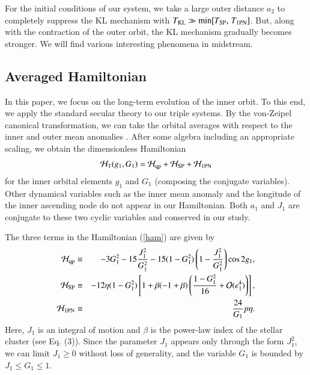 \documentclass[useAMS,usenatbib,twocolumn]{mn2e}
\newcommand{\beqa}{\begin{eqnarray}}
\newcommand{\eeqa}{\end{eqnarray}}
\begin{document}
For the initial conditions of our system, we take a large outer distance $a_2$ to
completely suppress the KL mechanism with 
$T_{\rm KL}\gg{\rm min}[T_{\rm SP},\,T_{\rm 1PN}]$. But, along with the contraction
of
the outer orbit, the KL mechanism gradually becomes stronger. We will find
various interesting phenomena in midstream.




\subsection{Averaged Hamiltonian}



In this paper, we focus on the long-term evolution of the inner
orbit. To this end, we apply the standard secular theory to our
triple systems. By the von-Zeipel canonical transformation, we
can take the orbital averages with respect to the inner and
outer mean anomalies \citep{harrington1968,ford2000,blaes2002}.
After some algebra including an appropriate scaling, we obtain
the dimensionless Hamiltonian
\beqa 
\mathcal{H}_{\rm T}(g_{1}, G_{1})=\mathcal{H}_{\rm
qp}+\mathcal{H}_{\rm SP}+\mathcal{H}_{\rm 1PN}
\label{ham}
\eeqa
for the inner orbital elements $g_1$ and $G_1$ (composing the
conjugate variables).
Other dynamical variables such as the inner mean anomaly and the
longitude of the inner ascending node do not appear in our Hamiltonian.
Both $a_1$ and $J_1$ are conjugate to these two  cyclic variables
 and conserved in our study.
 


The three terms in the Hamiltonian (\ref{ham}) are given by
\beqa
\mathcal{H}_{\rm qp}&\equiv&
-3G_{1}^{2}-15\frac{J_{1}^{2}}{G_{1}^{2}}-15(1-G_{1}^{2})\left(1-\frac{J_{1}^{2}}{G_{1}^{2}}\right)\cos
2g_{1},\label{hq}\\
\mathcal{H}_{\rm SP}&\equiv&-12\eta
(1-G_{1}^{2})\left[1+\beta(-1+\beta)\left(\frac{1-G_{1}^{2}}{16}+\mathcal{O}(e_{1}^{4})\right)\right],\label{hs}\\
\mathcal{H}_{\rm1PN}&\equiv&\frac{24}{G_{1}}p\eta.\label{h1}
\eeqa
Here, $J_1$ is an integral of motion and $\beta$ is the power-law index
of the stellar cluster (see Eq. (3)). 
Since the parameter $J_1$ appears only through the form $J_1^2$, we can limit
$J_1\ge 0$ without loss of generality, and the variable $G_1$
is bounded by $ J_1\le G_1\le 1$.
\end{document}
